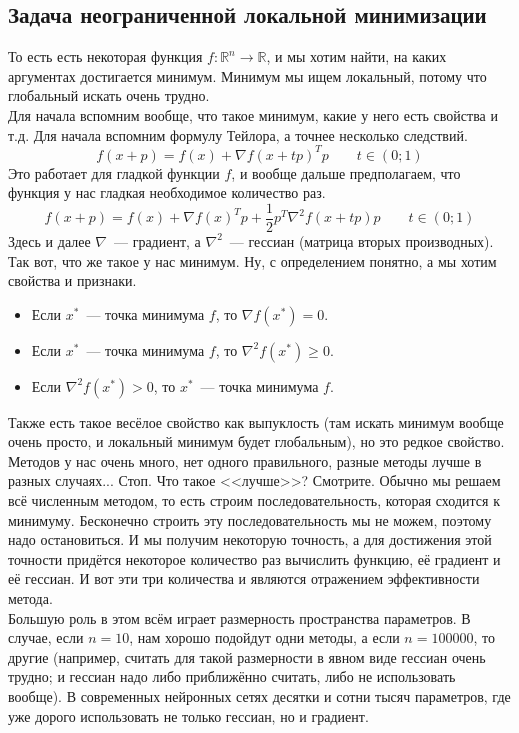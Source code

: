 \documentclass{article}
\begin{document}
    \subsection{Задача неограниченной локальной минимизации}
    То есть есть некоторая функция $f\colon\mathbb R^n\to\mathbb R$, и мы хотим найти, на каких аргументах достигается минимум. Минимум мы ищем локальный, потому что глобальный искать очень трудно.\\
    Для начала вспомним вообще, что такое минимум, какие у него есть свойства и т.д. Для начала вспомним формулу Тейлора, а точнее несколько следствий.
    $$
    f(x+p)=f(x)+\nabla f(x+tp)^Tp\qquad t\in (0;1)
    $$
    Это работает для гладкой функции $f$, и вообще дальше предполагаем, что функция у нас гладкая необходимое количество раз.
    $$
    f(x+p)=f(x)+\nabla f(x)^Tp+\frac12p^T\nabla^2f(x+tp)p\qquad t\in(0;1)
    $$
    Здесь и далее $\nabla$~--- градиент, а $\nabla^2$~--- гессиан (матрица вторых производных).\\
    Так вот, что же такое у нас минимум. Ну, с определением понятно, а мы хотим свойства и признаки.
    \begin{itemize}
        \item Если $x^*$~--- точка минимума $f$, то $\nabla f(x^*)=0$.
        \item Если $x^*$~--- точка минимума $f$, то $\nabla^2 f(x^*)\geqslant0$.
        \item Если $\nabla^2 f(x^*)>0$, то $x^*$~--- точка минимума $f$.
    \end{itemize}
    Также есть такое весёлое свойство как выпуклость (там искать минимум вообще очень просто, и локальный минимум будет глобальным), но это редкое свойство.\\
    Методов у нас очень много, нет одного правильного, разные методы лучше в разных случаях... Стоп. Что такое <<лучше>>? Смотрите. Обычно мы решаем всё численным методом, то есть строим последовательность, которая сходится к минимуму. Бесконечно строить эту последовательность мы не можем, поэтому надо остановиться. И мы получим некоторую точность, а для достижения этой точности придётся некоторое количество раз вычислить функцию, её градиент и её гессиан. И вот эти три количества и являются отражением эффективности метода.\\
    Большую роль в этом всём играет размерность пространства параметров. В случае, если $n=10$, нам хорошо подойдут одни методы, а если $n=100000$, то другие (например, считать для такой размерности в явном виде гессиан очень трудно; и гессиан надо либо приближённо считать, либо не использовать вообще). В современных нейронных сетях десятки и сотни тысяч параметров, где уже дорого использовать не только гессиан, но и градиент.
\end{document}
